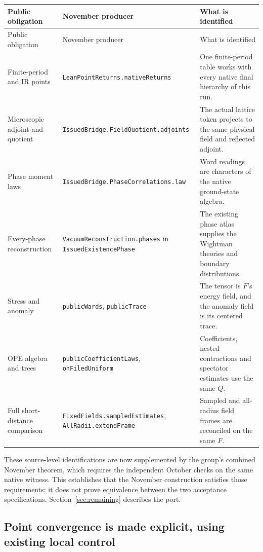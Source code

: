 \documentclass[11pt]{article}
\newcommand{\code}[1]{{\small\nolinkurl{#1}}}
\begin{document}
\begingroup\small\setlength{\tabcolsep}{4pt}
\renewcommand{\arraystretch}{1.15}
\begin{longtable}{@{}>{\raggedright\arraybackslash}p{}>{\raggedright\arraybackslash}p{}>{\raggedright\arraybackslash}p{}@{}}
\toprule Public obligation & November producer & What is identified\\\midrule\endfirsthead
\toprule Public obligation & November producer & What is identified\\\midrule\endhead
Finite-period and IR points & \code{LeanPointReturns.nativeReturns} & One finite-period table works with every native final hierarchy of this run.\\
Microscopic adjoint and quotient & \code{IssuedBridge.FieldQuotient.adjoints} & The actual lattice token projects to the same physical field and reflected adjoint.\\
Phase moment laws & \code{IssuedBridge.PhaseCorrelations.law} & Word readings are characters of the native ground-state algebra.\\
Every-phase reconstruction & \code{VacuumReconstruction.phases} in \code{IssuedExistencePhase} & The existing phase atlas supplies the Wightman theories and boundary distributions.\\
Stress and anomaly & \code{publicWards}, \code{publicTrace} & The tensor is $F$'s energy field, and the anomaly field is its centered trace.\\
OPE algebra and trees & \code{publicCoefficientLaws}, \code{onFiledUniform} & Coefficients, nested contractions and spectator estimates use the same $Q$.\\
Full short-distance comparison & \code{FixedFields.sampledEstimates}, \code{AllRadii.extendFrame} & Sampled and all-radius field frames are reconciled on the same $F$.\\
\bottomrule
\end{longtable}\endgroup

These source-level identifications are now supplemented by the group's
combined November theorem, which requires the independent October checks
on the same native witness. This establishes that the November construction
satisfies those requirements; it does not prove equivalence between the
two acceptance specifications. Section~\ref{sec:remaining} describes the port.

\subsection{Point convergence is made explicit, using existing local control}
\end{document}
